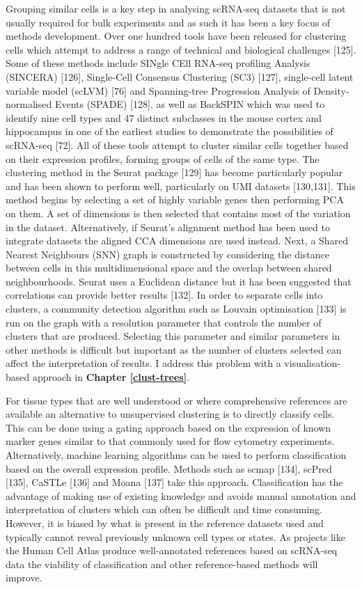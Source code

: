 \documentclass[11pt,a4paper,titlepage,twoside,openright]{style/unimelbthesis}
\theoremstyle{definition}
\theoremstyle{definition}
\theoremstyle{definition}
\theoremstyle{remark}
\begin{document}
\begin{mainmatter}
Grouping similar cells is a key step in analysing scRNA-seq datasets that is not usually required for bulk experiments and as such it has been a key focus of methods development. Over one hundred tools have been released for clustering cells which attempt to address a range of technical and biological challenges {[}125{]}. Some of these methods include SINgle CEll RNA-seq profiling Analysis (SINCERA) {[}126{]}, Single-Cell Consensus Clustering (SC3) {[}127{]}, single-cell latent variable model (scLVM) {[}76{]} and Spanning-tree Progression Analysis of Density-normalised Events (SPADE) {[}128{]}, as well as BackSPIN which was used to identify nine cell types and 47 distinct subclasses in the mouse cortex and hippocampus in one of the earliest studies to demonstrate the possibilities of scRNA-seq {[}72{]}. All of these tools attempt to cluster similar cells together based on their expression profiles, forming groups of cells of the same type. The clustering method in the Seurat package {[}129{]} has become particularly popular and has been shown to perform well, particularly on UMI datasets {[}130,131{]}. This method begins by selecting a set of highly variable genes then performing PCA on them. A set of dimensions is then selected that contains most of the variation in the dataset. Alternatively, if Seurat's alignment method has been used to integrate datasets the aligned CCA dimensions are used instead. Next, a Shared Nearest Neighbours (SNN) graph is constructed by considering the distance between cells in this multidimensional space and the overlap between shared neighbourhoods. Seurat uses a Euclidean distance but it has been suggested that correlations can provide better results {[}132{]}. In order to separate cells into clusters, a community detection algorithm such as Louvain optimisation {[}133{]} is run on the graph with a resolution parameter that controls the number of clusters that are produced. Selecting this parameter and similar parameters in other methods is difficult but important as the number of clusters selected can affect the interpretation of results. I address this problem with a visualisation-based approach in \textbf{Chapter \ref{clust-trees}}.

For tissue types that are well understood or where comprehensive references are available an alternative to unsupervised clustering is to directly classify cells. This can be done using a gating approach based on the expression of known marker genes similar to that commonly used for flow cytometry experiments. Alternatively, machine learning algorithms can be used to perform classification based on the overall expression profile. Methods such as scmap {[}134{]}, scPred {[}135{]}, CaSTLe {[}136{]} and Moana {[}137{]} take this approach. Classification has the advantage of making use of existing knowledge and avoids manual annotation and interpretation of clusters which can often be difficult and time consuming. However, it is biased by what is present in the reference datasets used and typically cannot reveal previously unknown cell types or states. As projects like the Human Cell Atlas produce well-annotated references based on scRNA-seq data the viability of classification and other reference-based methods will improve.


\end{mainmatter}
\end{document}
